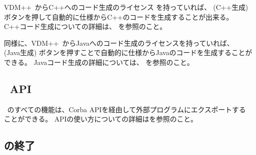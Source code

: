 \documentclass[\pformat,12pt]{jarticle}
\newcommand{\vdmslpp}{VDM++}
\newcommand{\guicmd}[1]{{\gt #1}}
\begin{document}
\vdmslpp\ からC++へのコード生成のライセンス を持っていれば、 
(\guicmd{C++生成}) ボタンを押して自動的に仕様からC++のコードを生成することが出来る。
C++コード生成についての詳細は、
を参照のこと。




同様に、\vdmslpp\ からJavaへのコード生成のライセンスを持っていれば、
(\guicmd{Java生成}) ボタンを押すことで自動的に仕様からJavaのコードを生成することができる。
Javaコード生成の詳細については、\cite{CGJavaManPP-SCSK} を参照のこと。




\subsection{\protect\VDMTools\ API}

\VDMTools\ のすべての機能は、Corba APIを経由して外部プログラムにエクスポートすることができる。
APIの使い方についての詳細は\cite{APIMan-SCSK}を参照のこと。



\subsection{\protect\VDMTools の終了}
\end{document}
